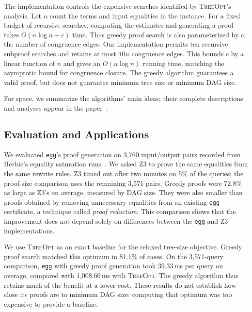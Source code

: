 The implementation controls the expensive searches identified by \textsc{TreeOpt}'s analysis.
Let $n$ count the terms and input equalities in the instance.
For a fixed budget of recursive searches, computing the estimates and generating a proof
  takes $O(n\log n+c)$ time.
Thus greedy proof search is also parameterized by $c$, the number of congruence edges.
Our implementation permits ten recursive subproof searches
  and retains at most $10n$ congruence edges.
This bounds $c$ by a linear function of $n$ and gives an $O(n\log n)$ running time,
  matching the asymptotic bound for congruence closure.
The greedy algorithm guarantees a valid proof, but does not guarantee
  minimum tree size or minimum DAG size.

For space, we summarize the algorithms' main ideas;
  their complete descriptions and analyses appear in the paper~\cite{eggproof}.

\subsection{Evaluation and Applications}
\label{sec:proofs-evaluation}

We evaluated \texttt{egg}'s proof generation on 3,760 input/output pairs
  recorded from Herbie's equality saturation runs~\cite{eggproof}.
We asked Z3 to prove the same equalities from the same rewrite rules.
Z3 timed out after two minutes on 5\% of the queries;
  the proof-size comparison uses the remaining 3,571 pairs.
Greedy proofs were 72.8\% as large as Z3's on average, measured by DAG size.
They were also smaller than proofs obtained by removing unnecessary equalities
  from an existing \texttt{egg} certificate, a technique called \emph{proof reduction}.
This comparison shows that the improvement does not depend solely
  on differences between the \texttt{egg} and Z3 implementations.

We use \textsc{TreeOpt} as an exact baseline for the relaxed tree-size objective.
Greedy proof search matched this optimum in 81.1\% of cases.
On the 3,571-query comparison, \texttt{egg} with greedy proof generation
  took 39.33\,ms per query on average, compared with 1,008.60\,ms with \textsc{TreeOpt}.
The greedy algorithm thus retains much of the benefit at a lower cost.
These results do not establish how close its proofs are to minimum DAG size:
  computing that optimum was too expensive to provide a baseline.

